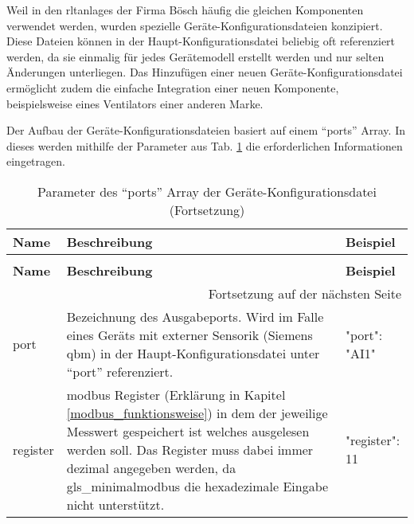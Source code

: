 \begin{enumerate}
	Weil in den \acsp{rltanlage} der Firma Bösch häufig die gleichen Komponenten verwendet werden, wurden spezielle Geräte-Konfigurationsdateien konzipiert. Diese Dateien können in der Haupt-Konfigurationsdatei beliebig oft referenziert werden, da sie einmalig für jedes Gerätemodell erstellt werden und nur selten Änderungen unterliegen. Das Hinzufügen einer neuen Geräte-Konfigurationsdatei ermöglicht zudem die einfache Integration einer neuen Komponente, beispielsweise eines Ventilators einer anderen Marke.
	
	Der Aufbau der Geräte-Konfigurationsdateien basiert auf einem \enquote{ports} Array. In dieses werden mithilfe der Parameter aus Tab. \ref{tab:ports_array_parameter} die erforderlichen Informationen eingetragen.
    
\begin{longtable}[h]{p{} p{} | p{}}
    \caption{Parameter des \enquote{ports} Array der Geräte-Konfigurationsdateien}
    \label{tab:ports_array_parameter}
    \\ \toprule
    \textbf{Name} & \textbf{Beschreibung} & \textbf{Beispiel}
    \\ \midrule
    \endfirsthead
    \caption{Parameter des \enquote{ports} Array der Geräte-Konfigurationsdatei (Fortsetzung)}
    \\ \toprule
    \textbf{Name} & \textbf{Beschreibung} & \textbf{Beispiel}
    \\ \midrule
    \endhead
    \midrule
    \multicolumn{3}{r}{{Fortsetzung auf der nächsten Seite}} 
    \\ \bottomrule
    \endfoot
    \bottomrule
    \endlastfoot
    port      	& Bezeichnung des Ausgabeports. Wird im Falle eines Geräts mit externer Sensorik (\zB Siemens \gls{qbm}) in der Haupt-Konfigurationsdatei unter \enquote{port} referenziert. & 
    \begin{jsonTable}
"port": "AI1"
    \end{jsonTable} 
    \\
    register 	& \gls{modbus} Register (Erklärung in Kapitel \ref{modbus_funktionsweise}) in dem der jeweilige Messwert gespeichert ist \bzw welches ausgelesen werden soll. Das Register muss dabei immer dezimal angegeben werden, da \gls{gls_minimalmodbus} die hexadezimale Eingabe nicht unterstützt. & 
    \begin{jsonTable}
"register": 11
    \end{jsonTable} 
    \\

\end{longtable}
\end{enumerate}
